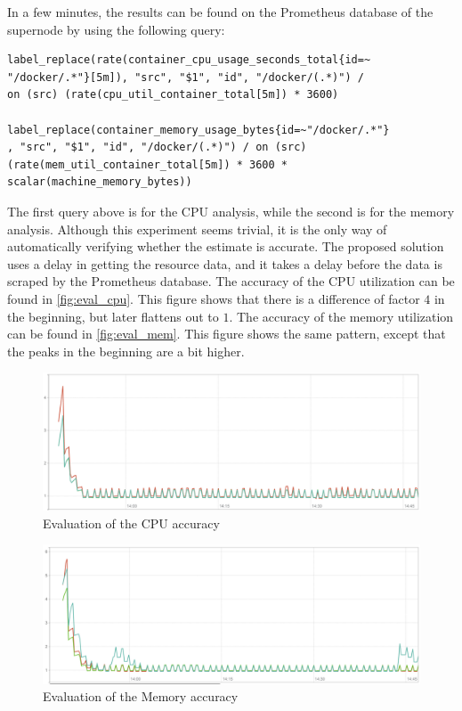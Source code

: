 \noindent
In a few minutes, the results can be found on the Prometheus database of the supernode by using the following query:

\begin{verbatim}
label_replace(rate(container_cpu_usage_seconds_total{id=~
"/docker/.*"}[5m]), "src", "$1", "id", "/docker/(.*)") / 
on (src) (rate(cpu_util_container_total[5m]) * 3600)

label_replace(container_memory_usage_bytes{id=~"/docker/.*"}
, "src", "$1", "id", "/docker/(.*)") / on (src)
(rate(mem_util_container_total[5m]) * 3600 * 
scalar(machine_memory_bytes))
\end{verbatim}

\noindent
The first query above is for the CPU analysis, while the second is for the memory analysis. Although this experiment seems trivial, it is the only way of automatically verifying whether the estimate is accurate. The proposed solution uses a delay in getting the resource data, and it takes a delay before the data is scraped by the Prometheus database. The accuracy of the CPU utilization can be found in \autoref{fig:eval_cpu}. This figure shows that there is a difference of factor $4$ in the beginning, but later flattens out to $1$. The accuracy of the memory utilization can be found in \autoref{fig:eval_mem}. This figure shows the same pattern, except that the peaks in the beginning are a bit higher.\\

\begin{figure}
    \centering
    \includegraphics[width=\textwidth]{gfx/eval_cpu}
    \caption{Evaluation of the CPU accuracy}
    \label{fig:eval_cpu}
\end{figure}

\begin{figure}
    \centering
    \includegraphics[width=\textwidth]{gfx/eval_mem}
    \caption{Evaluation of the Memory accuracy}
    \label{fig:eval_mem}
\end{figure}

